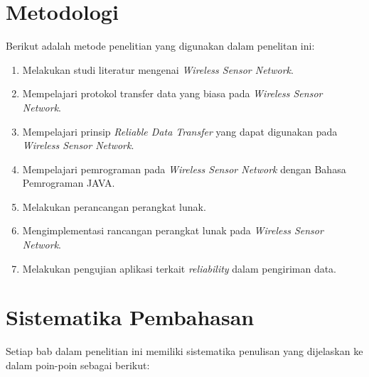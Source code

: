 \section{Metodologi}
\label{sec:metlit}
Berikut adalah metode penelitian yang digunakan dalam penelitan ini:
\begin{enumerate}
	\item Melakukan studi literatur mengenai \textit{Wireless Sensor Network}.
	\item Mempelajari protokol transfer data yang biasa pada \textit{Wireless Sensor Network}.
	\item Mempelajari prinsip \textit{Reliable Data Transfer} yang dapat digunakan pada \textit{Wireless Sensor Network}.	
	\item Mempelajari pemrograman pada \textit{Wireless Sensor Network} dengan Bahasa Pemrograman JAVA.
	\item Melakukan perancangan perangkat lunak.
	\item Mengimplementasi rancangan perangkat lunak pada \textit{Wireless Sensor Network}.
	\item Melakukan pengujian aplikasi terkait \textit{reliability} dalam pengiriman data.
\end{enumerate}

\section{Sistematika Pembahasan}
\label{sec:sispem}
Setiap bab dalam penelitian ini memiliki sistematika penulisan yang dijelaskan ke dalam poin-poin sebagai berikut:

